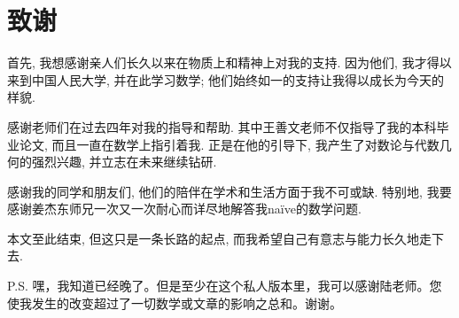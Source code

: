 \documentclass[12pt,UTF8]{ctexart}
\theoremstyle{definition}
\theoremstyle{remark}
\begin{document}
\newpage
{}
\section*{致谢}

首先, 我想感谢亲人们长久以来在物质上和精神上对我的支持. 因为他们, 我才得以来到中国人民大学, 并在此学习数学; 他们始终如一的支持让我得以成长为今天的样貌.

感谢老师们在过去四年对我的指导和帮助. 其中王善文老师不仅指导了我的本科毕业论文, 而且一直在数学上指引着我. 正是在他的引导下, 我产生了对数论与代数几何的强烈兴趣, 并立志在未来继续钻研.  

感谢我的同学和朋友们, 他们的陪伴在学术和生活方面于我不可或缺.
特别地, 我要感谢姜杰东师兄一次又一次耐心而详尽地解答我na\"ive的数学问题.

本文至此结束, 但这只是一条长路的起点, 而我希望自己有意志与能力长久地走下去.

P.S. 嘿，我知道已经晚了。但是至少在这个私人版本里，我可以感谢陆老师。您使我发生的改变超过了一切数学或文章的影响之总和。谢谢。
\end{document}
